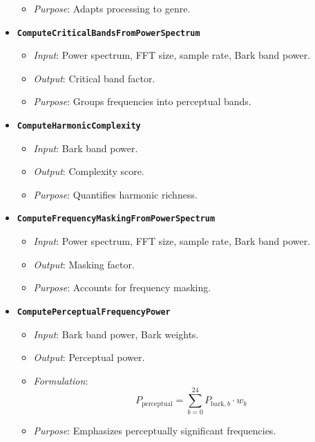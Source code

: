 \documentclass[11pt]{article}
\begin{document}
\begin{itemize}[label=$\bullet$]
\begin{itemize}
\begin{equation}
        \end{equation}
      \item \textit{Purpose}: Adapts processing to genre.
    \end{itemize}
  \item \textbf{\texttt{ComputeCriticalBandsFromPowerSpectrum}}
    \begin{itemize}
      \item \textit{Input}: Power spectrum, FFT size, sample rate, Bark band power.
      \item \textit{Output}: Critical band factor.
      \item \textit{Purpose}: Groups frequencies into perceptual bands.
    \end{itemize}
  \item \textbf{\texttt{ComputeHarmonicComplexity}}
    \begin{itemize}
      \item \textit{Input}: Bark band power.
      \item \textit{Output}: Complexity score.
      \item \textit{Purpose}: Quantifies harmonic richness.
    \end{itemize}
  \item \textbf{\texttt{ComputeFrequencyMaskingFromPowerSpectrum}}
    \begin{itemize}
      \item \textit{Input}: Power spectrum, FFT size, sample rate, Bark band power.
      \item \textit{Output}: Masking factor.
      \item \textit{Purpose}: Accounts for frequency masking.
    \end{itemize}
  \item \textbf{\texttt{ComputePerceptualFrequencyPower}}
    \begin{itemize}
      \item \textit{Input}: Bark band power, Bark weights.
      \item \textit{Output}: Perceptual power.
      \item \textit{Formulation}:
        \begin{equation}
        P_{\text{perceptual}} = \sum_{b=0}^{24} P_{\text{bark},b} \cdot w_b
        \end{equation}
      \item \textit{Purpose}: Emphasizes perceptually significant frequencies.
    \end{itemize}
\end{itemize}
\end{document}
